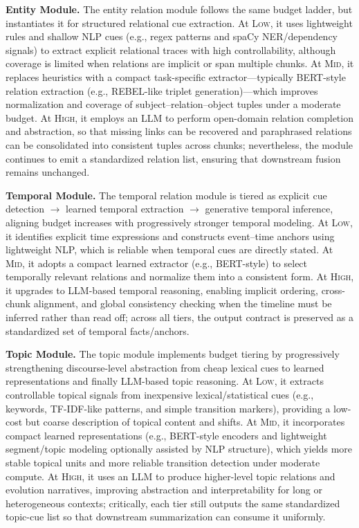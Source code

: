 \textbf{Entity Module.}
The entity relation module follows the same budget ladder, but instantiates it for structured relational cue extraction. At \textsc{Low}, it uses lightweight rules and shallow NLP cues (e.g., regex patterns and spaCy NER/dependency signals) to extract explicit relational traces with high controllability, although coverage is limited when relations are implicit or span multiple chunks. At \textsc{Mid}, it replaces heuristics with a compact task-specific extractor---typically BERT-style relation extraction (e.g., REBEL-like triplet generation)---which improves normalization and coverage of subject--relation--object tuples under a moderate budget. At \textsc{High}, it employs an LLM to perform open-domain relation completion and abstraction, so that missing links can be recovered and paraphrased relations can be consolidated into consistent tuples across chunks; nevertheless, the module continues to emit a standardized relation list, ensuring that downstream fusion remains unchanged.

\textbf{Temporal Module.}
The temporal relation module is tiered as explicit cue detection $\rightarrow$ learned temporal extraction $\rightarrow$ generative temporal inference, aligning budget increases with progressively stronger temporal modeling. At \textsc{Low}, it identifies explicit time expressions and constructs event--time anchors using lightweight NLP, which is reliable when temporal cues are directly stated. At \textsc{Mid}, it adopts a compact learned extractor (e.g., BERT-style) to select temporally relevant relations and normalize them into a consistent form. At \textsc{High}, it upgrades to LLM-based temporal reasoning, enabling implicit ordering, cross-chunk alignment, and global consistency checking when the timeline must be inferred rather than read off; across all tiers, the output contract is preserved as a standardized set of temporal facts/anchors.

\textbf{Topic Module.}
The topic module implements budget tiering by progressively strengthening discourse-level abstraction from cheap lexical cues to learned representations and finally LLM-based topic reasoning. At \textsc{Low}, it extracts controllable topical signals from inexpensive lexical/statistical cues (e.g., keywords, TF-IDF-like patterns, and simple transition markers), providing a low-cost but coarse description of topical content and shifts. At \textsc{Mid}, it incorporates compact learned representations (e.g., BERT-style encoders and lightweight segment/topic modeling optionally assisted by NLP structure), which yields more stable topical units and more reliable transition detection under moderate compute. At \textsc{High}, it uses an LLM to produce higher-level topic relations and evolution narratives, improving abstraction and interpretability for long or heterogeneous contexts; critically, each tier still outputs the same standardized topic-cue list so that downstream summarization can consume it uniformly.

